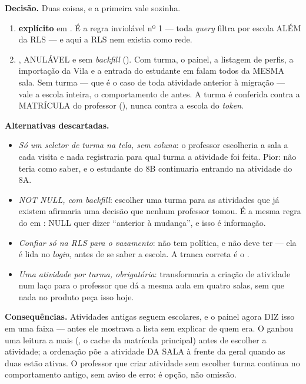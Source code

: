 \textbf{Decisão.} Duas coisas, e a primeira vale sozinha.

\begin{enumerate}
  \item \textbf{ explícito} em . É a
    regra inviolável nº 1 --- toda \emph{query} filtra por escola ALÉM da RLS ---
    e aqui a RLS nem existia como rede.
  \item \textbf{}, ANULÁVEL e sem
    \emph{backfill} (). Com turma, o
    painel, a listagem de perfis, a importação da Vila e a entrada do estudante em
     falam todos da MESMA sala. Sem turma --- que é o caso de toda
    atividade anterior à migração --- vale a escola inteira, o comportamento de
    antes. A turma é conferida contra a MATRÍCULA do professor
    (), nunca contra a escola do \emph{token}.
\end{enumerate}

\textbf{Alternativas descartadas.}
\begin{itemize}
  \item \emph{Só um seletor de turma na tela, sem coluna}: o professor
    escolheria a sala a cada visita e nada registraria para qual turma a
    atividade foi feita. Pior:  não teria como saber, e o estudante do
    8B continuaria entrando na atividade do 8A.
  \item \emph{ NOT NULL, com \emph{backfill}}: escolher uma turma
    para as atividades que já existem afirmaria uma decisão que nenhum professor
    tomou. É a mesma regra do  em
    : NULL quer dizer
    ``anterior à mudança'', e isso é informação.
  \item \emph{Confiar só na RLS para o vazamento}:  não tem política, e
    não deve ter --- ela é lida no \emph{login}, antes de se saber a escola. A
    tranca correta é o .
  \item \emph{Uma atividade por turma, obrigatória}: transformaria a criação de
    atividade num laço para o professor que dá a mesma aula em quatro salas, sem
    que nada no produto peça isso hoje.
\end{itemize}

\textbf{Consequências.} Atividades antigas seguem escolares, e o painel agora
DIZ isso em uma faixa --- antes ele mostrava a lista sem explicar de quem era. O
 ganhou uma leitura a mais (, o cache da
matrícula principal) antes de escolher a atividade; a ordenação põe a atividade
DA SALA à frente da geral quando as duas estão ativas. O professor que criar
atividade sem escolher turma continua no comportamento antigo, sem aviso de
erro: é opção, não omissão.

